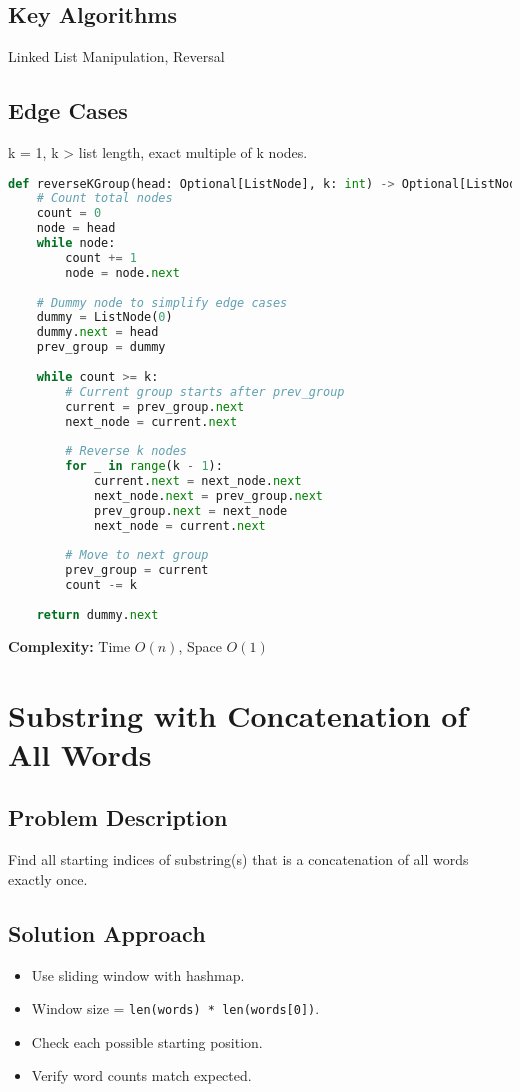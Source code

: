 \documentclass[10pt, a4paper]{article}
\begin{document}
\subsection*{Key Algorithms}
Linked List Manipulation, Reversal

\subsection*{Edge Cases}
k = 1, k > list length, exact multiple of k nodes.

\begin{lstlisting}[language=Python]
def reverseKGroup(head: Optional[ListNode], k: int) -> Optional[ListNode]:
    # Count total nodes
    count = 0
    node = head
    while node:
        count += 1
        node = node.next
    
    # Dummy node to simplify edge cases
    dummy = ListNode(0)
    dummy.next = head
    prev_group = dummy
    
    while count >= k:
        # Current group starts after prev_group
        current = prev_group.next
        next_node = current.next
        
        # Reverse k nodes
        for _ in range(k - 1):
            current.next = next_node.next
            next_node.next = prev_group.next
            prev_group.next = next_node
            next_node = current.next
        
        # Move to next group
        prev_group = current
        count -= k
    
    return dummy.next
\end{lstlisting}
\textbf{Complexity:} Time $O(n)$, Space $O(1)$

\section{Substring with Concatenation of All Words}
\subsection*{Problem Description}
Find all starting indices of substring(s) that is a concatenation of all words exactly once.

\subsection*{Solution Approach}
\begin{itemize}
    \item Use sliding window with hashmap.
    \item Window size = \texttt{len(words) * len(words[0])}.
    \item Check each possible starting position.
    \item Verify word counts match expected.
\end{itemize}
\end{document}
